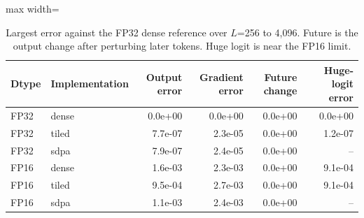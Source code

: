 \begin{table}[!htb]
\centering
\scriptsize
\setlength{\tabcolsep}{3.5pt}
\caption{Largest error against the FP32 dense reference over $L$=256 to 4,096. Future is the output change after perturbing later tokens. Huge logit is near the FP16 limit.}
\label{tab:t2aerr}
\begin{adjustbox}{max width=\linewidth}
\begin{tabular}{llrrrr}
\toprule
Dtype & Implementation & Output error & Gradient error & Future change & Huge-logit error \\
\midrule
FP32 & dense & 0.0e+00 & 0.0e+00 & 0.0e+00 & 0.0e+00 \\
FP32 & tiled & 7.7e-07 & 2.3e-05 & 0.0e+00 & 1.2e-07 \\
FP32 & sdpa & 7.9e-07 & 2.4e-05 & 0.0e+00 & -- \\
FP16 & dense & 1.6e-03 & 2.3e-03 & 0.0e+00 & 9.1e-04 \\
FP16 & tiled & 9.5e-04 & 2.7e-03 & 0.0e+00 & 9.1e-04 \\
FP16 & sdpa & 1.1e-03 & 2.4e-03 & 0.0e+00 & -- \\
\bottomrule
\end{tabular}
\end{adjustbox}
\end{table}
